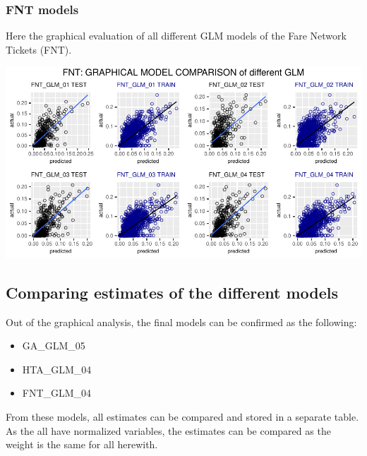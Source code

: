 \documentclass[
]{article}
\providecommand{\tightlist}{%
  \setlength{\itemsep}{0pt}\setlength{\parskip}{0pt}}
\begin{document}
\hypertarget{fnt-models}{%
\subsubsection{FNT models}\label{fnt-models}}

Here the graphical evaluation of all different GLM models of the Fare
Network Tickets (FNT).

\includegraphics{Influence_factors_files/figure-latex/2.30_FNT_model_eval_graphically-1.pdf}

\hypertarget{comparing-estimates-of-the-different-models}{%
\subsection{Comparing estimates of the different
models}\label{comparing-estimates-of-the-different-models}}

Out of the graphical analysis, the final models can be confirmed as the
following:

\begin{itemize}
\tightlist
\item
  GA\_GLM\_05
\item
  HTA\_GLM\_04
\item
  FNT\_GLM\_04
\end{itemize}

From these models, all estimates can be compared and stored in a
separate table. As the all have normalized variables, the estimates can
be compared as the weight is the same for all herewith.
\end{document}
